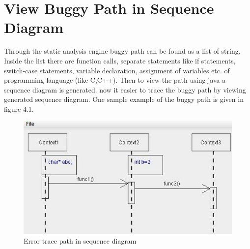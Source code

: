 \section{View Buggy Path in Sequence Diagram}
Through the static analysis engine buggy path can be found as a list of string. Inside the list there are function calls, separate statements like if statements, switch-case statements, variable declaration, assignment of variables etc. of programming language (like C,C++). Then to view the path using java a sequence diagram is generated.
now it easier to trace the buggy path by viewing generated sequence diagram. One sample example of the buggy path is given in figure 4.1.
\begin{figure}[htbp]
	\centering
	\includegraphics{styles/Error_trace_path.jpg}
	\caption{Error trace path in sequence diagram}
\end{figure}

